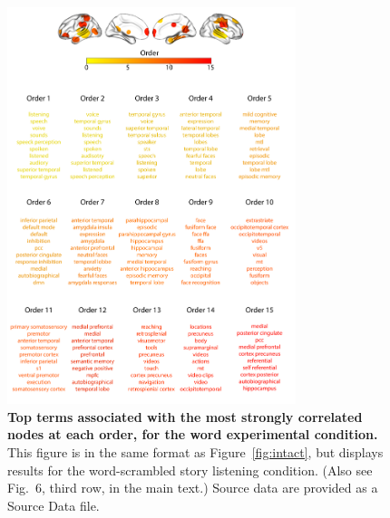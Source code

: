 \documentclass[english]{article}
\newcommand{\neurosynth}{6}
\begin{document}
\begin{figure}[p!]
\centering
\includegraphics[width=0.75\textwidth]{figs/supp_15_word}
\caption{\textbf{Top terms associated with the most strongly
      correlated nodes at each order, for the word experimental
    condition.}  This figure is in the same format as
  Figure~\ref{fig:intact}, but displays results for the
  word-scrambled story listening condition.  (Also see Fig.~\neurosynth,
third row, in the main text.) Source data are provided as a Source Data file.}
\label{fig:word}
\end{figure}
\end{document}
